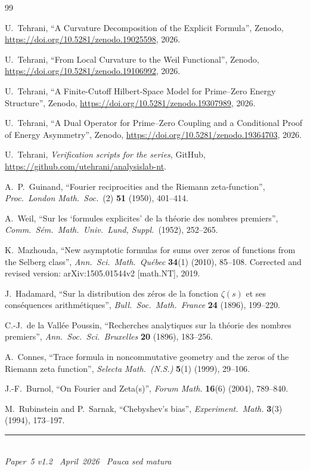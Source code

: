 \documentclass[11pt]{article}
\begin{document}
\newpage
\begin{thebibliography}{99}

U.~Tehrani,
``A Curvature Decomposition of the Explicit Formula'',
Zenodo, \url{https://doi.org/10.5281/zenodo.19025598}, 2026.

U.~Tehrani,
``From Local Curvature to the Weil Functional'',
Zenodo, \url{https://doi.org/10.5281/zenodo.19106992}, 2026.

U.~Tehrani,
``A Finite-Cutoff Hilbert-Space Model
for Prime--Zero Energy Structure'',
Zenodo, \url{https://doi.org/10.5281/zenodo.19307989}, 2026.

U.~Tehrani,
``A Dual Operator for Prime--Zero Coupling
and a Conditional Proof of Energy Asymmetry'',
Zenodo, \url{https://doi.org/10.5281/zenodo.19364703}, 2026.

U.~Tehrani,
\emph{Verification scripts for the series},
GitHub, \url{https://github.com/utehrani/analysislab-nt}.

A.~P.~Guinand,
``Fourier reciprocities and the Riemann zeta-function'',
\emph{Proc.\ London Math.\ Soc.}\ (2) \textbf{51} (1950), 401--414.

A.~Weil,
``Sur les `formules explicites' de la th\'eorie des nombres premiers'',
\emph{Comm.\ S\'em.\ Math.\ Univ.\ Lund, Suppl.}\ (1952), 252--265.

K.~Mazhouda,
``New asymptotic formulas for sums over zeros of functions
from the Selberg class'',
\emph{Ann.\ Sci.\ Math.\ Qu\'ebec} \textbf{34}(1) (2010), 85--108.
Corrected and revised version: arXiv:1505.01544v2 [math.NT], 2019.

J.~Hadamard,
``Sur la distribution des z\'eros de la fonction $\zeta(s)$
et ses cons\'equences arithm\'etiques'',
\emph{Bull.\ Soc.\ Math.\ France} \textbf{24} (1896), 199--220.

C.-J.~de la Vall\'ee Poussin,
``Recherches analytiques sur la th\'eorie des nombres premiers'',
\emph{Ann.\ Soc.\ Sci.\ Bruxelles} \textbf{20} (1896), 183--256.

A.~Connes,
``Trace formula in noncommutative geometry and the zeros
of the Riemann zeta function'',
\emph{Selecta Math.\ (N.S.)} \textbf{5}(1) (1999), 29--106.

J.-F.~Burnol,
``On Fourier and Zeta(s)'',
\emph{Forum Math.} \textbf{16}(6) (2004), 789--840.

M.~Rubinstein and P.~Sarnak,
``Chebyshev's bias'',
\emph{Experiment.\ Math.} \textbf{3}(3) (1994), 173--197.

\end{thebibliography}

\enlargethispage{3\baselineskip}
\vspace*{\fill}
\begin{minipage}{\linewidth}
\rule{\linewidth}{0.4pt}\smallskip\\
\small\emph{Paper~5 v1.2 \textperiodcentered\ April~2026
\textperiodcentered\ Pauca sed matura}
\end{minipage}
\end{document}
